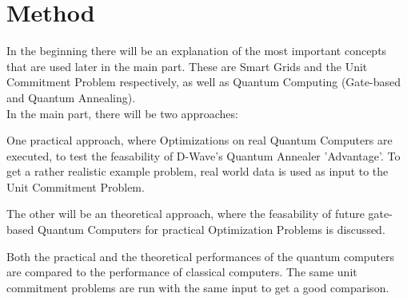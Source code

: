 \section{Method}

In the beginning there will be an explanation of the most important concepts
that are used later in the main part.
These are Smart Grids and the Unit Commitment Problem respectively,
as well as Quantum Computing (Gate-based and Quantum Annealing).\\

\noindent In the main part, there will be two approaches:

One practical approach, where Optimizations on real Quantum Computers are executed,
to test the feasability of D-Wave's Quantum Annealer 'Advantage'.
To get a rather realistic example problem, real world data is used as input to the Unit Commitment Problem.

The other will be an theoretical approach, where the feasability of future gate-based Quantum Computers
for practical Optimization Problems is discussed.

Both the practical and the theoretical performances of the quantum computers
are compared to the performance of classical computers.
The same unit commitment problems are run with the same input to get a good comparison.
